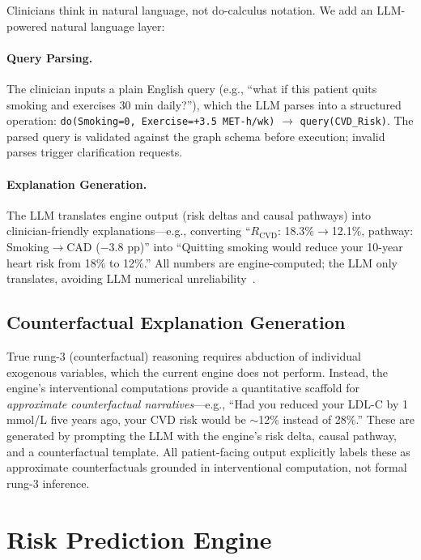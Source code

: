 \documentclass[runningheads]{llncs}
\begin{document}
Clinicians think in natural language, not do-calculus notation.
We add an LLM-powered natural language layer:

\paragraph{Query Parsing.}
The clinician inputs a plain English query (e.g., ``what if this
patient quits smoking and exercises 30 min daily?''), which the LLM
parses into a structured operation:
\texttt{do(Smoking=0, Exercise=+3.5 MET-h/wk)} $\to$
\texttt{query(CVD\_Risk)}.
The parsed query is validated against the graph schema before
execution; invalid parses trigger clarification requests.

\paragraph{Explanation Generation.}
The LLM translates engine output (risk deltas and causal pathways)
into clinician-friendly explanations---e.g., converting
``$R_{\text{CVD}}$: 18.3\%$\to$12.1\%, pathway:
Smoking$\to$CAD ($-$3.8 pp)'' into ``Quitting smoking would reduce
your 10-year heart risk from 18\% to 12\%.''
All numbers are engine-computed; the LLM only translates,
avoiding LLM numerical unreliability~\cite{jin2023cladder}.

\subsection{Counterfactual Explanation Generation}\label{sec:counterfactual}

True rung-3 (counterfactual) reasoning requires abduction of
individual exogenous variables, which the current engine does not
perform.
Instead, the engine's interventional computations provide a
quantitative scaffold for \emph{approximate counterfactual
narratives}---e.g., ``Had you reduced your LDL-C by 1\,mmol/L
five years ago, your CVD risk would be ${\sim}$12\% instead of
28\%.''
These are generated by prompting the LLM with the engine's risk
delta, causal pathway, and a counterfactual template.
All patient-facing output explicitly labels these as approximate
counterfactuals grounded in interventional computation, not formal
rung-3 inference.

\section{Risk Prediction Engine}\label{sec:risk}
\end{document}
